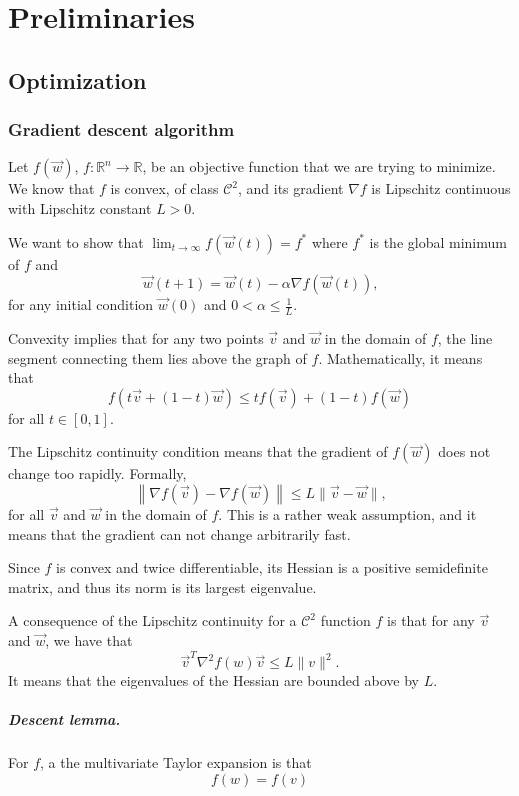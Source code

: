 \chapter{Preliminaries}


\section{Optimization}

\subsection{Gradient descent algorithm}

Let $f(\vec{w})$, $f : \mathbb{R}^n \rightarrow \mathbb{R}$, be an objective function that
we are trying to minimize.  We know that
$f$ is convex, of class $\mathcal{C}^2$, and its gradient $\nabla f$ is Lipschitz continuous with Lipschitz
constant $L > 0$.

We want to show that $\lim_{t\rightarrow\infty} f(\vec{w}(t)) = f^{*}$ where $f^{*}$
is the global minimum of $f$ and $$\vec{w}(t+1) = \vec{w}(t) - \alpha \nabla f(\vec{w}(t))\mbox{,}$$
for any initial condition $\vec{w}(0)$ and $0 < \alpha \leq \frac{1}{L}$.

Convexity implies that for any two points $\vec{v}$ and $\vec{w}$ in the domain of
$f$, the line segment connecting them lies above the graph of $f$.  Mathematically, it
means that $$f(t\vec{v} + (1 - t) \vec{w}) \leq t f(\vec{v}) + (1 - t)
f(\vec{w})$$ for all $t \in [0, 1]$.

The Lipschitz continuity condition means that the gradient of $f(\vec{w})$ does not change too rapidly.
Formally, $$\left\|\nabla f(\vec{v}) - \nabla f(\vec{w})\right\| \leq L \|\vec{v} - \vec{w}\|\mbox{,}$$
for all $\vec{v}$ and $\vec{w}$ in the domain of $f$.  This is a rather weak
assumption, and it means that the gradient can not change arbitrarily fast.

Since $f$ is convex and twice differentiable, its Hessian is a positive semidefinite
matrix, and thus its norm is its largest eigenvalue.

A consequence of the Lipschitz continuity for a $\mathcal{C}^2$ function $f$ is that for
any $\vec{v}$ and $\vec{w}$, we have that
\begin{equation}
  \label{eq:lcg1}
  \vec{v}^T \nabla^2 f(w) \vec{v} \leq L \|v\|^2\text{.}
\end{equation}
It means that the eigenvalues of the Hessian are bounded above by $L$.

\paragraph{Descent lemma.}  For $f$, a the multivariate Taylor expansion is that
$$f(w) = f(v)$$
